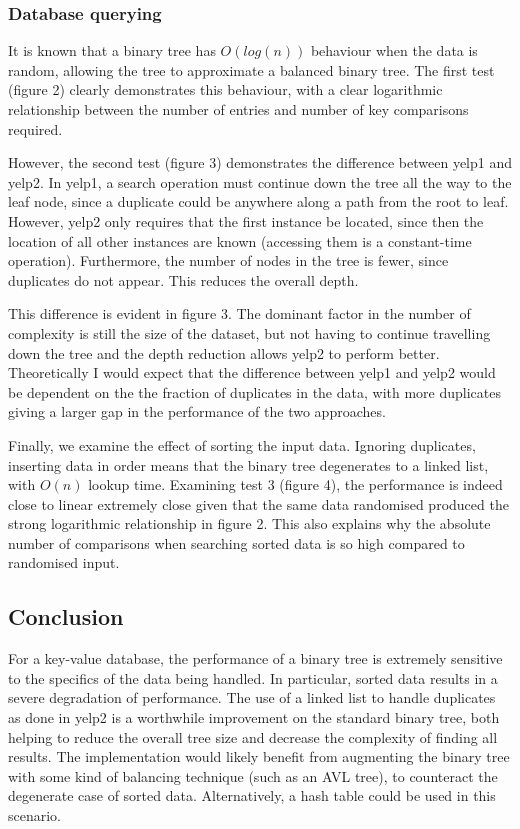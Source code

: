 \documentclass[australian,english]{article}
\begin{document}
\subsubsection*{Database querying}

It is known that a binary tree has $O(log(n))$ behaviour when the
data is random, allowing the tree to approximate a balanced binary
tree. The first test (figure 2) clearly demonstrates this behaviour,
with a clear logarithmic relationship between the number of entries
and number of key comparisons required. 

However, the second test (figure 3) demonstrates the difference between
yelp1 and yelp2. In yelp1, a search operation must continue down the
tree all the way to the leaf node, since a duplicate could be anywhere
along a path from the root to leaf. However, yelp2 only requires that
the first instance be located, since then the location of all other
instances are known (accessing them is a constant-time operation).
Furthermore, the number of nodes in the tree is fewer, since duplicates
do not appear. This reduces the overall depth.

This difference is evident in figure 3. The dominant factor in the
number of complexity is still the size of the dataset, but not having
to continue travelling down the tree and the depth reduction allows
yelp2 to perform better. Theoretically I would expect that the difference
between yelp1 and yelp2 would be dependent on the the fraction of
duplicates in the data, with more duplicates giving a larger gap in
the performance of the two approaches.

Finally, we examine the effect of sorting the input data. Ignoring
duplicates, inserting data in order means that the binary tree degenerates
to a linked list, with $O(n)$ lookup time. Examining test 3 (figure
4), the performance is indeed close to linear \textemdash{} extremely
close given that the same data randomised produced the strong logarithmic
relationship in figure 2. This also explains why the absolute number
of comparisons when searching sorted data is so high compared to randomised
input.

\subsection*{Conclusion}

For a key-value database, the performance of a binary tree is extremely
sensitive to the specifics of the data being handled. In particular,
sorted data results in a severe degradation of performance. The use
of a linked list to handle duplicates as done in yelp2 is a worthwhile
improvement on the standard binary tree, both helping to reduce the
overall tree size and decrease the complexity of finding all results.
The implementation would likely benefit from augmenting the binary
tree with some kind of balancing technique (such as an AVL tree),
to counteract the degenerate case of sorted data. Alternatively, a
hash table could be used in this scenario.
\end{document}
